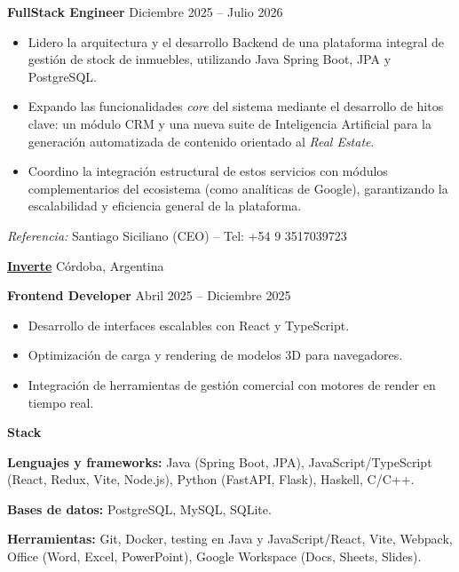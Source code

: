 \documentclass[11pt]{article}
\begin{document}
\textbf{FullStack Engineer}  \hfill Diciembre 2025 – Julio 2026 
\begin{itemize}[noitemsep, topsep=0pt, partopsep=0pt, parsep=0pt]
    \item Lidero la arquitectura y el desarrollo Backend de una plataforma integral de gestión de stock de inmuebles, utilizando Java Spring Boot, JPA y PostgreSQL. 
    \item Expando las funcionalidades \textit{core} del sistema mediante el desarrollo de hitos clave: un módulo CRM y una nueva suite de Inteligencia Artificial para la generación automatizada de contenido orientado al \textit{Real Estate}. 
    \item Coordino la integración estructural de estos servicios con módulos complementarios del ecosistema (como analíticas de Google), garantizando la escalabilidad y eficiencia general de la plataforma.
\end{itemize}
\vspace{4pt}
\textit{Referencia:} Santiago Siciliano (CEO) -- Tel: +54 9 3517039723

\vspace{12pt}

\href{https://inverte.com.ar/}{\textbf{Inverte}}  \hfill Córdoba, Argentina 

\textbf{Frontend Developer}  \hfill Abril 2025  – Diciembre 2025 
\begin{itemize}[noitemsep, topsep=0pt, partopsep=0pt, parsep=0pt]
    \item Desarrollo de interfaces escalables con React y TypeScript. 
    \item Optimización de carga y rendering de modelos 3D para navegadores. 
    \item Integración de herramientas de gestión comercial con motores de render en tiempo real. 
\end{itemize}

\vspace{12pt}

\begin{center}
    \textbf{Stack} 
\end{center}

\textbf{Lenguajes y frameworks:} Java (Spring Boot, JPA), JavaScript/TypeScript (React, Redux, Vite, Node.js), Python  (FastAPI, Flask), Haskell, C/C++. 

\textbf{Bases de datos:} PostgreSQL, MySQL, SQLite. 

\textbf{Herramientas:} Git, Docker, testing en Java y JavaScript/React, Vite, Webpack, Office (Word, Excel, PowerPoint), Google Workspace (Docs, Sheets, Slides). 
\end{document}
